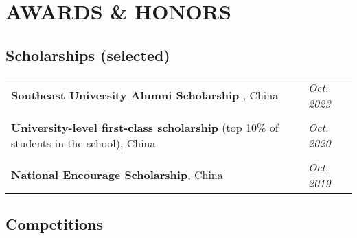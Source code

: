 \documentclass[a4paper,12pt]{article}
\begin{document}
\section{AWARDS \& HONORS}

\subsection*{Scholarships (selected)}

\begin{tabularx}{\linewidth}{@{}l X@{}}

\hspace{0.2cm} \textbf{Southeast University Alumni Scholarship} , China & \hfill \normalsize{\textit{Oct. 2023}}\\
\\
\hspace{0.2cm} \textbf{University-level first-class scholarship} (top 10\% of students in the school), China & \hfill \normalsize{\textit{Oct. 2020}}\\
\\
\hspace{0.2cm} \textbf{National Encourage Scholarship}, China & \hfill \normalsize{\textit{Oct. 2019}}\\
\end{tabularx}

\subsection*{Competitions}
\end{document}
